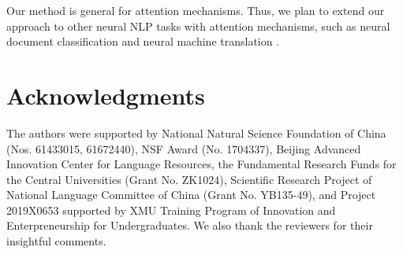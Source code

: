 \documentclass[11pt,a4paper]{article}
\begin{document}
Our method is general for attention mechanisms.
Thus,
we plan to extend our approach to other neural NLP tasks with attention mechanisms,
such as neural document classification \cite{Yang:NAACL2016} and neural machine translation \cite{Zhang:TPAMI2018}.


\section*{Acknowledgments}
The authors were supported by National Natural Science Foundation of China (Nos. 61433015, 61672440), 
NSF Award (No. 1704337),
Beijing Advanced Innovation Center for Language Resources, 
the Fundamental Research Funds for the Central Universities (Grant No. ZK1024), 
Scientific Research Project of National Language Committee of China (Grant No. YB135-49), 
and Project 2019X0653 supported by XMU Training Program of Innovation and Enterpreneurship for Undergraduates. 
We also thank the reviewers for their insightful comments.







\end{document}
